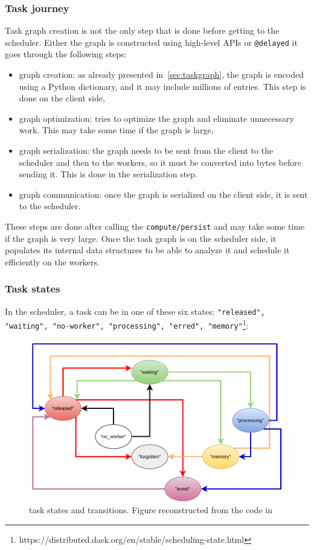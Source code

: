 \subsubsection{Task journey}\label{sec:taskjourney}
Task graph creation is not the only step that is done before getting to the scheduler.
Either the graph is constructed using high-level APIs or \texttt{@delayed} it goes through the following steps:
\begin{itemize}
    \item graph creation: as already presented in~\ref{sec:taskgraph}, the graph is encoded using a Python dictionary, and it may include millions of entries. This step is done on the client side, 
    \item graph optimization: \dask tries to optimize the graph and eliminate unnecessary work. This may take some time if the graph is large,
    \item graph serialization: the graph needs to be sent from the client to the scheduler and then to the workers, so it must be converted into bytes before sending it. This is done in the serialization step. 
    \item graph communication: once the graph is serialized on the client side, it is sent to the scheduler.
\end{itemize}
These steps are done after calling the \texttt{compute/persist} and may take some time if the graph is very large. 
Once the task graph is on the scheduler side, it populates its internal data structures to be able to analyze it and schedule it efficiently on the workers.

\subsubsection{Task states}\label{sec:taskstate}
In the \dask scheduler, a task can be in one of these six states: \texttt{"released", "waiting", "no-worker", "processing", "erred", "memory"}\footnote{https://distributed.dask.org/en/stable/scheduling-state.html}:

\begin{figure}
\includegraphics[scale=0.55]{figures/Dask-TaskStatesSheduler1.pdf}
\caption{\dask task states and transitions. Figure reconstructed from the code in~\cite{amal_distributed_2022}}
\label{figdasktaskstate1}
\end{figure}

